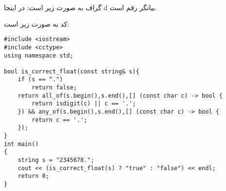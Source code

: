 

گراف به صورت زیر است:
در اینجا d بیانگر رقم است.
\begin{latin}
\end{latin}
کد به صورت زیر است:
\begin{latin}
    \begin{lstlisting}
#include <iostream>
#include <cctype>
using namespace std;

bool is_correct_float(const string& s){
    if (s == ".")
        return false;
    return all_of(s.begin(),s.end(),[] (const char c) -> bool {
        return isdigit(c) || c == '.';
    }) && any_of(s.begin(),s.end(),[] (const char c) -> bool {
        return c == '.';
    });
}
int main()
{
    string s = "2345678.";
    cout << (is_correct_float(s) ? "true" : "false") << endl;
    return 0;
}
    \end{lstlisting}
\end{latin}
